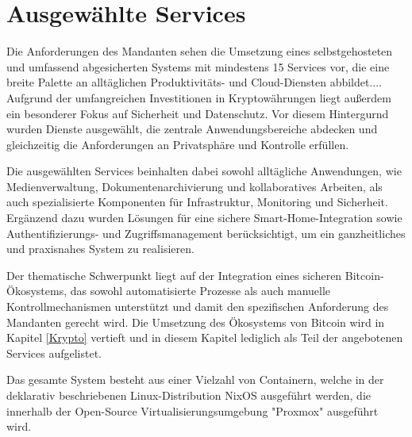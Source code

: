 \section{Ausgewählte Services}
Die Anforderungen des Mandanten sehen die Umsetzung eines selbstgehosteten und umfassend abgesicherten Systems mit mindestens 15 Services vor, die \glqq eine breite Palette an alltäglichen Produktivitäts- und Cloud-Diensten abbildet...\grqq. Aufgrund der umfangreichen Investitionen in Kryptowährungen liegt außerdem ein besonderer Fokus auf Sicherheit und Datenschutz. Vor diesem Hintergurnd wurden Dienste ausgewählt, die zentrale Anwendungsbereiche abdecken und gleichzeitig die Anforderungen an Privatsphäre und Kontrolle erfüllen. 

Die ausgewählten Services beinhalten dabei sowohl alltägliche Anwendungen, wie Medienverwaltung, Dokumentenarchivierung und kollaboratives Arbeiten, als auch spezialisierte Komponenten für Infrastruktur, Monitoring und Sicherheit. Ergänzend dazu wurden Lösungen für eine sichere Smart-Home-Integration sowie Authentifizierungs- und Zugriffsmanagement berücksichtigt, um ein ganzheitliches und praxisnahes System zu realisieren. 

Der thematische Schwerpunkt liegt auf der Integration eines sicheren Bitcoin-Ökosystems, das sowohl automatisierte Prozesse als auch manuelle Kontrollmechanismen unterstützt und damit den spezifischen Anforderung des Mandanten gerecht wird. Die Umsetzung des Ökosystems von Bitcoin wird in Kapitel \ref{Krypto} vertieft und in diesem Kapitel lediglich als Teil der angebotenen Services aufgelistet.

Das gesamte System besteht aus einer Vielzahl von Containern, welche in der deklarativ beschriebenen Linux-Distribution NixOS ausgeführt werden, die innerhalb der Open-Source Virtualisierungsumgebung "Proxmox" ausgeführt wird. 

